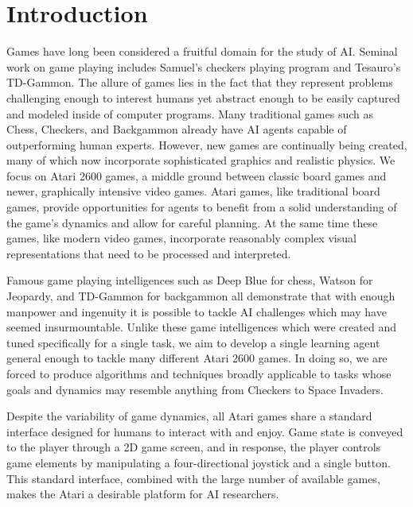 \documentclass{acm_proc_article-sp}
\begin{document}
\section{Introduction}
Games have long been considered a fruitful domain for the study of AI. Seminal work on game playing includes Samuel's checkers playing program\cite{samuel_59} and Tesauro's TD-Gammon\cite{tesauro_94}. The allure of games lies in the fact that they represent problems challenging enough to interest humans yet abstract enough to be easily captured and modeled inside of computer programs. Many traditional games such as Chess, Checkers, and Backgammon already have AI agents capable of outperforming human experts. However, new games are continually being created, many of which now incorporate sophisticated graphics and realistic physics. We focus on Atari 2600 games, a middle ground between classic board games and newer, graphically intensive video games. Atari games, like traditional board games, provide opportunities for agents to benefit from a solid understanding of the game's dynamics and allow for careful planning. At the same time these games, like modern video games, incorporate reasonably complex visual representations that need to be processed and interpreted.

Famous game playing intelligences such as Deep Blue for chess, Watson for Jeopardy, and TD-Gammon for backgammon all demonstrate that with enough manpower and ingenuity it is possible to tackle AI challenges which may have seemed insurmountable. Unlike these game intelligences which were created and tuned specifically for a single task, we aim to develop a single learning agent general enough to tackle many different Atari 2600 games. In doing so, we are forced to produce algorithms and techniques broadly applicable to tasks whose goals and dynamics may resemble anything from Checkers to Space Invaders.

Despite the variability of game dynamics, all Atari games share a standard interface designed for humans to interact with and enjoy. Game state is conveyed to the player through a 2D game screen, and in response, the player controls game elements by manipulating a four-directional joystick and a single button. This standard interface, combined with the large number of available games, makes the Atari a desirable platform for AI researchers. 
\end{document}
